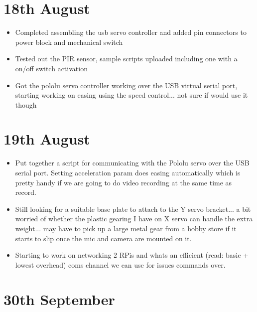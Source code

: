 \section*{18th August}

\begin{itemize}
  \item Completed assembling the usb servo controller and added pin connectors to power block and mechanical switch
  \item Tested out the PIR sensor, sample scripts uploaded including one with a on/off switch activation
  \item Got the pololu servo controller working over the USB virtual serial port, starting working on easing using the speed control... not sure if would use it though
\end{itemize}



\section*{19th August}

\begin{itemize}
  \item Put together a script for communicating with the Pololu servo over the USB serial port. Setting acceleration param does easing automatically which is pretty handy if we are going to do video recording at the same time as record.
  \item Still looking for a suitable base plate to attach to the Y servo bracket... a bit worried of whether the plastic gearing I have on X servo can handle the extra weight... may have to pick up a large metal gear from a hobby store if it starts to slip once the mic and camera are mounted on it.
  \item Starting to work on networking 2 RPis and whats an efficient (read: basic + lowest overhead) coms channel we can use for issues commands over.
\end{itemize}



\section*{30th September}

